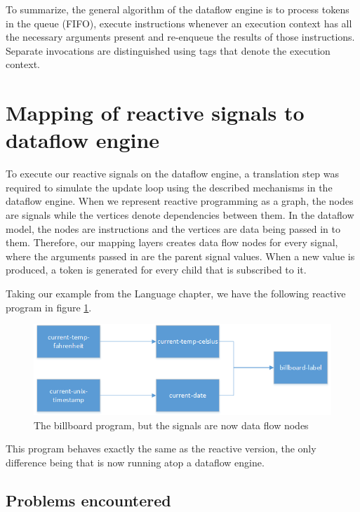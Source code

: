 To summarize, the general algorithm of the dataflow engine is to process tokens in the queue (FIFO), execute instructions whenever an execution context has all the necessary arguments present and re-enqueue the results of those instructions. Separate invocations are distinguished using tags that denote the execution context.

\section{Mapping of reactive signals to dataflow engine}

To execute our reactive signals on the dataflow engine, a translation step was required to simulate the update loop using the described mechanisms in the dataflow engine.
When we represent reactive programming as a graph, the nodes are signals while the vertices denote dependencies between them.
In the dataflow model, the nodes are instructions and the vertices are data being passed in to them. Therefore, our mapping layers creates data flow nodes for every signal, where the arguments passed in are the parent signal values. When a new value is produced, a token is generated for every child that is subscribed to it.

Taking our example from the Language chapter, we have the following reactive program in figure \ref{fig:engine-mapping-1}.

\begin{figure}[h!]
	\includegraphics[width=\textwidth]{images/Engine-Mapping-1.png}
	\caption{The billboard program, but the signals are now data flow nodes}
	\label{fig:engine-mapping-1}
\end{figure}

This program behaves exactly the same as the reactive version, the only difference being that is now running atop a dataflow engine.

\subsection{Problems encountered}

